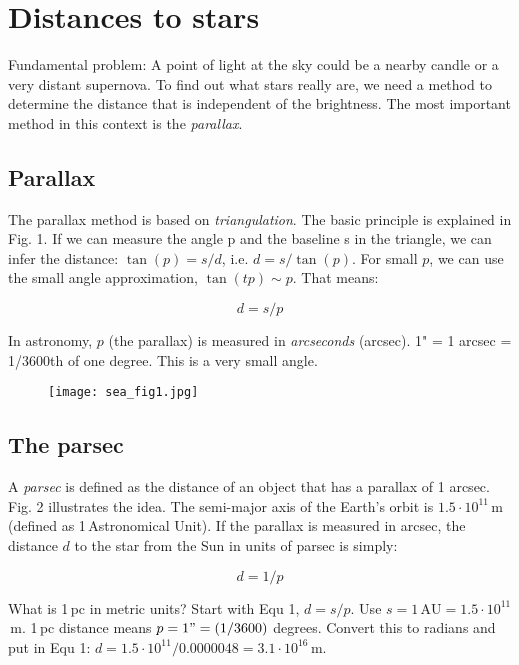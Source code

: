 \section{Distances to stars}

Fundamental problem: A point of light at the sky could be a nearby candle or a very distant supernova. To find out what stars really are, we need a method to determine the distance that is independent of the brightness. The most important method in this context is the \textit{parallax}.

\subsection{Parallax}

The parallax method is based on \textit{triangulation}. The basic principle is explained in Fig. 1. If we can measure the angle p and the baseline s in the triangle, we can infer the distance: $\tan{(p)} = s/d$, i.e. $d = s/\tan{(p)}$. For small $p$, we can use the small angle approximation, $\tan{(tp)} \sim p$. That means:

\begin{equation}
d = s/p
\end{equation}

In astronomy, $p$ (the parallax) is measured in \textit{arcseconds} (arcsec). 1" = 1 arcsec = 1/3600th of one degree. This is a very small angle.

\begin{figure}[h]
\begin{center}
\texttt{[image: sea\_fig1.jpg]}
\end{center}
\end{figure}

\subsection{The parsec}

A \textit{parsec} is defined as the distance of an object that has a parallax of 1 arcsec. Fig. 2 illustrates the idea. The semi-major axis of the Earth's orbit is $1.5 \cdot 10^{11}$\,m (defined as 1\,Astronomical Unit). If the parallax is measured in arcsec, the distance $d$ to the star from the Sun in units of parsec is simply:

\begin{equation}
d = 1/p
\end{equation}

What is 1\,pc in metric units? Start with Equ 1, $d = s/p$. Use $s = 1\,\mathrm{AU} = 1.5 \cdot 10^{11}$\,m. 1\,pc distance means $p = 1" = (1/3600)$ degrees. Convert this to radians and put in Equ 1: $d = 1.5 \cdot 10^{11} / 0.0000048 = 3.1 \cdot 10^{16}$\,m. 

